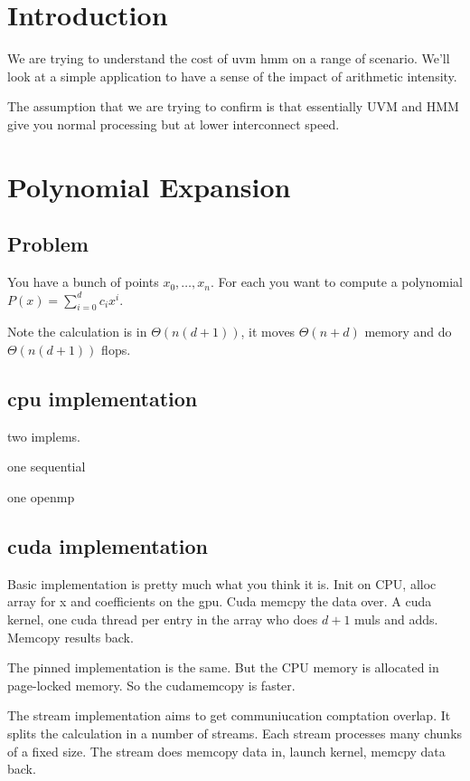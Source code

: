 \documentclass{article}
\begin{document}
\section{Introduction}

We are trying to understand the cost of uvm hmm on a range of
scenario. We'll look at a simple application to have a sense of the
impact of arithmetic intensity.

The assumption that we are trying to confirm is that essentially UVM
and HMM give you normal processing but at lower interconnect speed.

\section{Polynomial Expansion}

\subsection{Problem}

You have a bunch of points $x_0, \dots, x_n$. For each you want to compute a polynomial $P(x) = \sum_{i=0}^d c_i x^i$.

Note the calculation is in $\Theta(n(d+1))$, it moves $\Theta(n+d)$ memory and do $\Theta(n(d+1))$ flops.

\subsection{cpu implementation}

two implems.

one sequential

one openmp

\subsection{cuda implementation}

Basic implementation is pretty much what you think it is. Init on CPU,
alloc array for x and coefficients on the gpu. Cuda memcpy the data
over. A cuda kernel, one cuda thread per entry in the array who does
$d+1$ muls and adds. Memcopy results back.

The pinned implementation is the same. But the CPU memory is allocated
in page-locked memory. So the cudamemcopy is faster.

The stream implementation aims to get communiucation comptation
overlap. It splits the calculation in a number of streams. Each stream
processes many chunks of a fixed size. The stream does memcopy data
in, launch kernel, memcpy data back.
\end{document}
